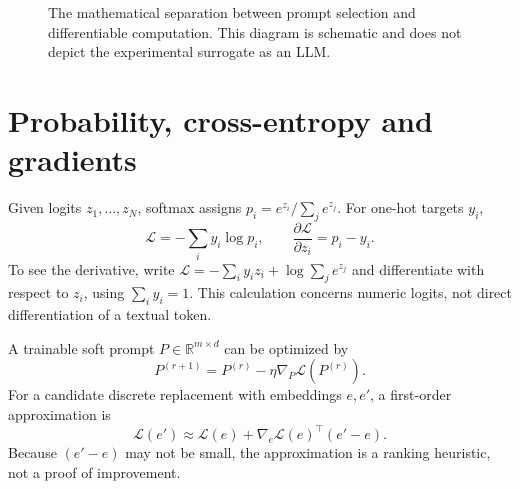 \documentclass[12pt,a4paper,oneside]{report}
\newcommand{\Vocab}{\mathcal V}
\newcommand{\R}{\mathbb R}
\begin{document}
\begin{figure}[htbp]\centering
{}
\caption{The mathematical separation between prompt selection and differentiable computation. This diagram is schematic and does not depict the experimental surrogate as an LLM.}\label{fig:interface}
\end{figure}

\section{Probability, cross-entropy and gradients}
Given logits $z_1,\ldots,z_N$, softmax assigns $p_i=e^{z_i}/\sum_j e^{z_j}$. For one-hot targets $y_i$,
\begin{equation}\mathcal L=-\sum_i y_i\log p_i,\qquad \frac{\partial\mathcal L}{\partial z_i}=p_i-y_i.\label{eq:softmaxgrad}\end{equation}
To see the derivative, write $\mathcal L=-\sum_i y_i z_i +\log\sum_j e^{z_j}$ and differentiate with respect to $z_i$, using $\sum_i y_i=1$. This calculation concerns numeric logits, not direct differentiation of a textual token.

A trainable soft prompt $P\in\R^{m\times d}$ can be optimized by
\begin{equation}P^{(r+1)}=P^{(r)}-\eta\nabla_P\mathcal L(P^{(r)}).\end{equation}
For a candidate discrete replacement with embeddings $e,e'$, a first-order approximation is
\begin{equation}\mathcal L(e')\approx\mathcal L(e)+\nabla_e\mathcal L(e)^\top(e'-e).\label{eq:taylor}\end{equation}
Because $(e'-e)$ may not be small, the approximation is a ranking heuristic, not a proof of improvement.
\end{document}
